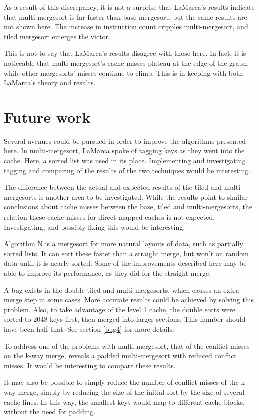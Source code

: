 As a result of this discrepancy, it is not a surprise that LaMarca's results
indicate that multi-mergesort is far faster than base-mergesort, but the same
results are not shown here. The increase in instruction count cripples
multi-mergesort, and tiled mergesort emerges the victor.

This is not to say that LaMarca's results disagree with those here. In fact, it
is noticeable that multi-mergesort's cache misses plateau at the edge of the
graph, while other mergesorts' misses continue to climb. This is in keeping with
both LaMarca's theory and results.

\section{Future work}
Several avenues could be pursued in order to improve the algorithms presented
here. In multi-mergesort, LaMarca spoke of tagging keys as they went into the
cache. Here, a sorted list was used in its place. Implementing and investigating
tagging and comparing of the results of the two techniques would be interesting.

The difference between the actual and expected results of the tiled and
multi-mergesorts is another area to be investigated. While the results point to
similar conclusions about cache misses between the base, tiled and
multi-mergesorts, the relation these cache misses for direct mapped caches is
not expected. Investigating, and possibly fixing this would be interesting.

Algorithm N is a mergesort for more natural layouts of data, such as partially
sorted lists. It can sort these faster than a straight merge, but won't on
random data until it is nearly sorted. Some of the improvements described here
may be able to improve its performance, as they did for the straight merge.

A bug exists in the double tiled and multi-mergesorts, which causes an extra
merge step in some cases. More accurate results could be achieved by solving
this problem. Also, to take advantage of the level 1 cache, the double sorts were
sorted to 2048 keys first, then merged into larger sections. This number should
have been half that. See section \ref{bug4} for more details.

To address one of the problems with multi-mergesort, that of the conflict misses
on the k-way merge, \cite{Xiao00} reveals a padded multi-mergesort with reduced 
conflict misses. It would be interesting to compare these results.

It may also be possible to simply reduce the number of conflict misses of the
k-way merge, simply by reducing the size of the initial sort by the size of several cache
lines. In this way, the smallest keys would map to different cache blocks,
without the need for padding.
